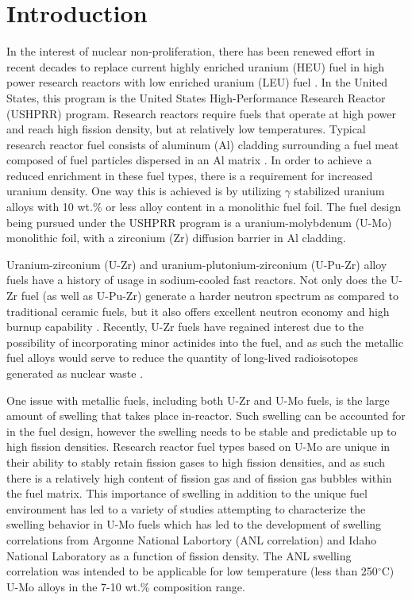 \documentclass[review]{elsarticle}
\begin{document}
\section{Introduction}

In the interest of nuclear non-proliferation, there has been renewed effort in recent decades to replace current highly enriched uranium (HEU) fuel in high power research reactors with low enriched uranium (LEU) fuel \cite{snelgrove1997}. In the United States, this program is the United States High-Performance Research Reactor (USHPRR) program. Research reactors require fuels that operate at high power and reach high fission density, but at relatively low temperatures. Typical research reactor fuel consists of aluminum (Al) cladding surrounding a fuel meat composed of fuel particles dispersed in an Al matrix \cite{meyer2014}. In order to achieve a reduced enrichment in these fuel types, there is a requirement for increased uranium density. One way this is achieved is by utilizing $\gamma$ stabilized uranium alloys with 10 wt.\% or less alloy content in a monolithic fuel foil. The fuel design being pursued under the USHPRR program is a uranium-molybdenum (U-Mo) monolithic foil, with a zirconium (Zr) diffusion barrier in Al cladding. 

Uranium-zirconium (U-Zr) and uranium-plutonium-zirconium (U-Pu-Zr) alloy fuels have a history of usage in sodium-cooled fast reactors. Not only does the U-Zr fuel (as well as U-Pu-Zr) generate a harder neutron spectrum as compared to traditional ceramic fuels, but it also offers excellent neutron economy and high burnup capability \cite{hofman1997}. Recently, U-Zr fuels have regained interest due to the possibility of incorporating minor actinides into the fuel, and as such the metallic fuel alloys would serve to reduce the quantity of long-lived radioisotopes generated as nuclear waste \cite{capriotti2017}. 

One issue with metallic fuels, including both U-Zr and U-Mo fuels, is the large amount of swelling that takes place in-reactor\cite{hofman1997}. Such swelling can be accounted for in the fuel design, however the swelling needs to be stable and predictable up to high fission densities. Research reactor fuel types based on U-Mo are unique in their ability to stably retain fission gases to high fission densities, and as such there is a relatively high content of fission gas and of fission gas bubbles within the fuel matrix. This importance of swelling in addition to the unique fuel environment has led to a variety of studies attempting to characterize the swelling behavior in U-Mo fuels \cite{rest2009, kim_anl08, meyer2002, kim2013} which has led to the development of swelling correlations from Argonne National Labortory (ANL correlation) \cite{kim2011} and Idaho National Laboratory \cite{umo_prelim_report2017} as a function of fission density. The ANL swelling correlation was intended to be applicable for low temperature (less than 250$^{\circ}$C) U-Mo alloys in the 7-10 wt.\% composition range. 
\end{document}
